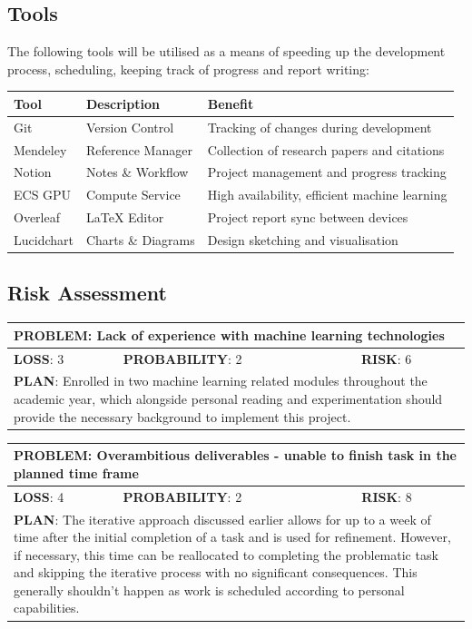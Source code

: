 \documentclass[a4paper,12pt]{article}
\begin{document}
\subsection{Tools}
The following tools will be utilised as a means of speeding up the development process, scheduling, keeping track of progress and report writing:

\begin{tabular}{|l l l|} 
 \hline
 Tool & Description & Benefit \\ [0.3ex] 
 \hline\hline
 Git & Version Control & Tracking of changes during development \\ 
 \hline
 Mendeley & Reference Manager & Collection of research papers and citations \\
  \hline
 Notion & Notes \& Workflow & Project management and progress tracking \\
 \hline
 ECS GPU & Compute Service & High availability, efficient machine learning \\
 \hline
 Overleaf & LaTeX Editor & Project report sync between devices \\
 \hline
 Lucidchart & Charts \& Diagrams & Design sketching and visualisation \\
 \hline
\end{tabular}
\subsection{Risk Assessment}
\begin{tabular}{|l|l|l|}
\hline
\multicolumn{3}{|l|}{\parbox[t]{\textwidth-1.15cm}{\textbf{PROBLEM}: Lack of experience with machine learning technologies}} \\ \hline
\textbf{LOSS}: 3& \textbf{PROBABILITY}: 2&\textbf{RISK}: 6\\ \hline
\multicolumn{3}{|l|}{\parbox[t]{\textwidth-1.15cm}{\textbf{PLAN}: Enrolled in two machine learning related modules throughout the academic year, which alongside personal reading and experimentation should provide the necessary background to implement this project.}} \\ \hline
\end{tabular}

\begin{tabular}{|l|l|l|}
\hline
\multicolumn{3}{|l|}{\parbox[t]{\textwidth-1.15cm}{\textbf{PROBLEM}: Overambitious deliverables - unable to finish task in the planned time frame\vspace{.2\baselineskip}}} \\ \hline
\textbf{LOSS}: 4& \textbf{PROBABILITY}: 2&\textbf{RISK}: 8\\ \hline
\multicolumn{3}{|l|}{\parbox[t]{\textwidth-1.15cm}{\textbf{PLAN}: The iterative approach discussed earlier allows for up to a week of time after the initial completion of a task and is used for refinement. However, if necessary, this time can be reallocated to completing the problematic task and skipping the iterative process with no significant consequences. This generally shouldn't happen as work is scheduled according to personal capabilities.}} \\ \hline
\end{tabular}
\end{document}
